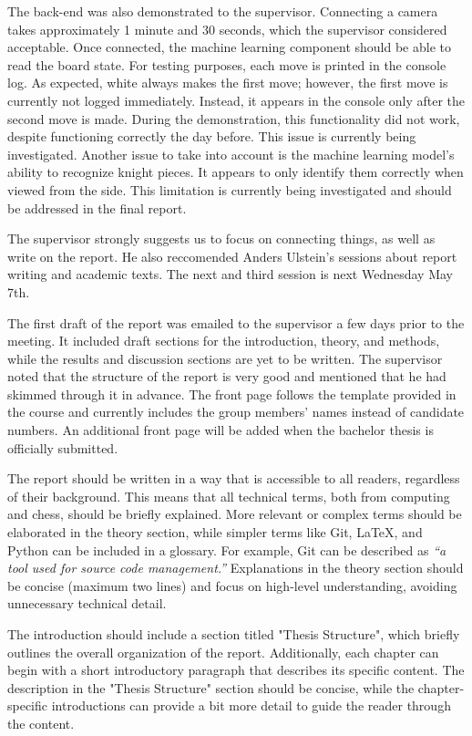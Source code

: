 The back-end was also demonstrated to the supervisor. Connecting a camera takes approximately 1 minute and 30 seconds, which the supervisor considered acceptable. Once connected, the machine learning component should be able to read the board state. For testing purposes, each move is printed in the console log. As expected, white always makes the first move; however, the first move is currently not logged immediately. Instead, it appears in the console only after the second move is made. During the demonstration, this functionality did not work, despite functioning correctly the day before. This issue is currently being investigated. Another issue to take into account is the machine learning model’s ability to recognize knight pieces. It appears to only identify them correctly when viewed from the side. This limitation is currently being investigated and should be addressed in the final report. 

The supervisor strongly suggests us to focus on connecting things, as well as write on the report. He also reccomended Anders Ulstein's sessions about report writing and academic texts. The next and third session is next Wednesday May 7th.  

The first draft of the report was emailed to the supervisor a few days prior to the meeting. It included draft sections for the introduction, theory, and methods, while the results and discussion sections are yet to be written. The supervisor noted that the structure of the report is very good and mentioned that he had skimmed through it in advance. The front page follows the template provided in the course and currently includes the group members' names instead of candidate numbers. An additional front page will be added when the bachelor thesis is officially submitted.

The report should be written in a way that is accessible to all readers, regardless of their background. This means that all technical terms, both from computing and chess, should be briefly explained. More relevant or complex terms should be elaborated in the theory section, while simpler terms like Git, LaTeX, and Python can be included in a glossary. For example, Git can be described as \textit{“a tool used for source code management.”} Explanations in the theory section should be concise (maximum two lines) and focus on high-level understanding, avoiding unnecessary technical detail.

The introduction should include a section titled "Thesis Structure", which briefly outlines the overall organization of the report. Additionally, each chapter can begin with a short introductory paragraph that describes its specific content. The description in the "Thesis Structure" section should be concise, while the chapter-specific introductions can provide a bit more detail to guide the reader through the content.

